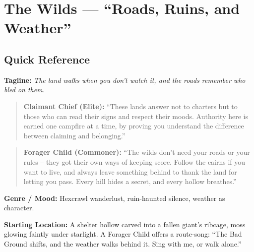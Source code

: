 \section{The Wilds --- ``Roads, Ruins, and Weather''}
\label{chap:wilderness}

\subsection*{Quick Reference}
\textbf{Tagline:} \textit{The land walks when you don't watch it, and the roads remember who bled on them.}

\begin{quote}
  \textbf{Claimant Chief (Elite):}  
  ``These lands answer not to charters but to those who can read their signs and respect their moods. Authority here is earned one campfire at a time, by proving you understand the difference between claiming and belonging.''
\end{quote}

\begin{quote}
  \textbf{Forager Child (Commoner):}  
  ``The wilds don't need your roads or your rules -- they got their own ways of keeping score. Follow the cairns if you want to live, and always leave something behind to thank the land for letting you pass. Every hill hides a secret, and every hollow breathes.''
\end{quote}

\textbf{Genre / Mood:} Hexcrawl wanderlust, ruin-haunted silence, weather as character.

\textbf{Starting Location:} A shelter hollow carved into a fallen giant's ribcage, moss glowing faintly under starlight. A Forager Child offers a route-song: ``The Bad Ground shifts, and the weather walks behind it. Sing with me, or walk alone.''

